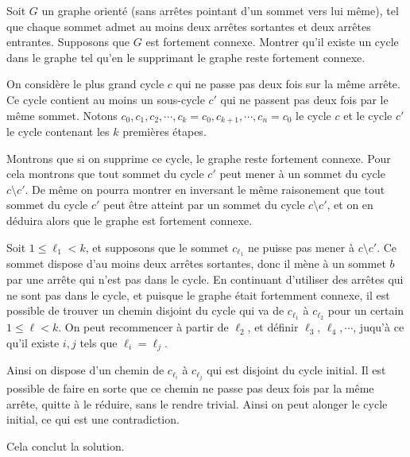 \begin{exo}%
Soit $G$ un graphe orienté (sans arrêtes pointant d'un sommet vers lui même), tel que chaque sommet admet au moins deux arrêtes sortantes et deux arrêtes entrantes. Supposons que $G$ est fortement connexe. Montrer qu'il existe un cycle dans le graphe tel qu'en le supprimant le graphe reste fortement connexe.
\end{exo}

\begin{sol}
On considère le plus grand cycle $c$ qui ne passe pas deux fois sur la même arrête. Ce cycle contient au moins un sous-cycle $c'$ qui ne passent pas deux fois par le même sommet. Notons $c_0,c_1,c_2,\cdots,c_k=c_0,c_{k+1},\cdots,c_n=c_0$ le cycle $c$ et
le cycle $c'$ le cycle contenant les $k$ premières étapes.

\medskip

Montrons que si on supprime ce cycle, le graphe reste fortement connexe. Pour cela montrons que tout sommet du cycle $c'$ peut mener à un sommet du cycle $c\setminus c'$. De même on pourra montrer en inversant le même raisonement que tout sommet du cycle $c'$ peut être atteint par un sommet du cycle $c\setminus c'$, et on en déduira alors que le graphe est fortement connexe.

\medskip

Soit $1\leq\ell_1<k$, et supposons que le sommet $c_{\ell_1}$ ne puisse pas mener à $c\setminus c'$. Ce sommet dispose d'au moins deux arrêtes sortantes, donc il mène à un sommet $b$ par une arrête qui n'est pas dans le cycle. En continuant d'utiliser des arrêtes qui ne sont pas dans le cycle, et puisque le graphe était fortemment connexe, il est possible de trouver un chemin disjoint du cycle qui va de $c_{\ell_1}$ à $c_{\ell_2}$ pour un certain $1\leq\ell<k$. On peut recommencer à partir de $\ell_2$, et définir $\ell_3$, $\ell_4,\cdots$, juqu'à ce qu'il existe $i,j$ tels que $\ell_i=\ell_j$.


Ainsi on dispose d'un chemin de $c_{\ell_i}$ à $c_{\ell_j}$ qui est disjoint du cycle initial. Il est possible de faire en sorte que ce chemin ne passe pas deux fois par la même arrête, quitte à le réduire, sans le rendre trivial. Ainsi on peut alonger le cycle initial, ce qui est une contradiction.

\medskip

Cela conclut la solution.


\end{sol}
